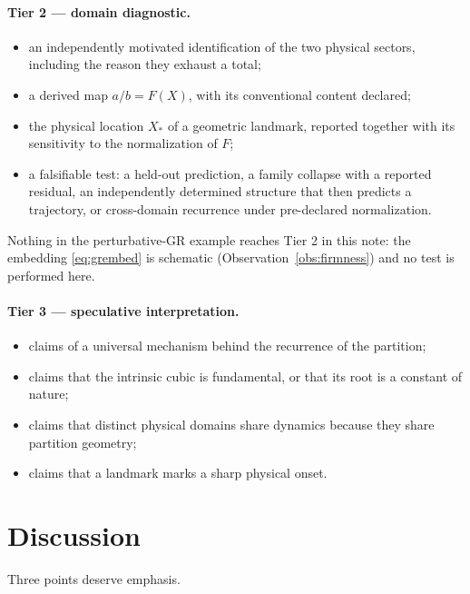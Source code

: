 \documentclass[11pt,a4paper]{article}
\theoremstyle{definition}
\theoremstyle{plain}
\theoremstyle{remark}
\begin{document}
\paragraph{Tier 2 --- domain diagnostic.}
\begin{itemize}[leftmargin=*,itemsep=1pt]
\item an independently motivated identification of the two physical sectors,
      including the reason they exhaust a total;
\item a derived map $a/b=F(X)$, with its conventional content declared;
\item the physical location $X_{*}$ of a geometric landmark, reported together
      with its sensitivity to the normalization of $F$;
\item a falsifiable test: a held-out prediction, a family collapse with a
      reported residual, an independently determined structure that then
      predicts a trajectory, or cross-domain recurrence under pre-declared
      normalization.
\end{itemize}
Nothing in the perturbative-GR example reaches Tier 2 in this note: the
embedding \eqref{eq:grembed} is schematic (Observation~\ref{obs:firmness}) and
no test is performed here.

\paragraph{Tier 3 --- speculative interpretation.}
\begin{itemize}[leftmargin=*,itemsep=1pt]
\item claims of a universal mechanism behind the recurrence of the partition;
\item claims that the intrinsic cubic is fundamental, or that its root is a
      constant of nature;
\item claims that distinct physical domains share dynamics because they share
      partition geometry;
\item claims that a landmark marks a sharp physical onset.
\end{itemize}

\section{Discussion}
\label{sec:discussion}

Three points deserve emphasis.
\end{document}
